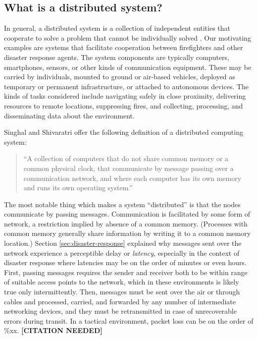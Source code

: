 \documentclass[]             %
{NASA}                       %
\theoremstyle{definition}
\newcommand{\citationneeded}{\textbf{[CITATION NEEDED]}}
\begin{document}
\subsection{What is a distributed system?}
In general, a distributed system is a collection of independent
entities that cooperate to solve a problem that cannot be individually
solved \cite{kshemkalyani_singhal_2008}. Our motivating examples are
systems that facilitate cooperation between firefighters and other
disaster response agents.  The system components are typically
computers, smartphones, sensors, or other kinds of communication
equipment. These may be carried by individuals, mounted to ground or
air-based vehicles, deployed as temporary or permanent infrastructure,
or attached to autonomous devices. The kinds of tasks considered
include navigating safely in close proximity, delivering resources to
remote locations, suppressing fires, and collecting, processing, and
disseminating data about the environment.

Singhal and Shivaratri \cite{10.5555/562065} offer the following
definition of a distributed computing system:

\begin{quote}
  ``A collection of computers that do not share common memory or a common
  physical clock, that communicate by message passing over a communication
  network, and where each computer has its own memory and runs its own
  operating system.''
\end{quote}
The most notable thing which makes a system ``distributed'' is that
the nodes communicate by passing messages. Communication is
facilitated by some form of network, a restriction implied by absence
of a common memory. (Processes with common memory generally share
information by writing it to a common memory location.) Section
\ref{sec:disaster-response} explained why messages sent over the
network experience a perceptible delay or \emph{latency}, especially
in the context of disaster response where latencies may be on the
order of minutes or even hours. First, passing messages requires the
sender and receiver both to be within range of suitable access points
to the network, which in these environments is likely true only
intermittently. Then, messages must be sent over the air or through
cables and processed, carried, and forwarded by any number of
intermediate networking devices, and they must be retransmitted in
case of unrecoverable errors during transit. In a tactical
environment, packet loss can be on the order of \%xx. \citationneeded
\end{document}
